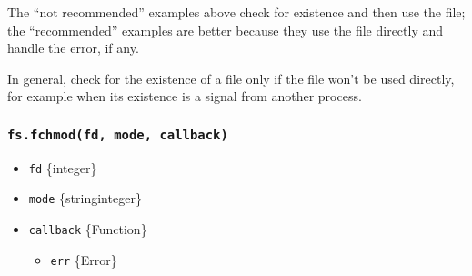 \begin{Shaded}
\begin{Highlighting}[]
\OperatorTok{,} \OperatorTok{;}

\NormalTok{(}\OperatorTok{,} \OperatorTok{,}\OperatorTok{,}\KeywordTok{=\textgreater{}}\NormalTok{ \{}
     \OperatorTok{===} \NormalTok{) \{}
      \NormalTok{(}\NormalTok{)}\OperatorTok{;}
      \OperatorTok{;}
\NormalTok{    \}}

    \OperatorTok{;}
\NormalTok{  \}}

  \NormalTok{ \{}
    \OperatorTok{;}
\NormalTok{  \} }\NormalTok{ \{}
    \OperatorTok{,}\KeywordTok{=\textgreater{}}\NormalTok{ \{}
      \OperatorTok{;}
\NormalTok{    \})}\OperatorTok{;}
\NormalTok{  \}}
\NormalTok{\})}\OperatorTok{;}
\end{Highlighting}
\end{Shaded}

The ``not recommended'' examples above check for existence and then use
the file; the ``recommended'' examples are better because they use the
file directly and handle the error, if any.

In general, check for the existence of a file only if the file won't be
used directly, for example when its existence is a signal from another
process.

\subsubsection{\texorpdfstring{\texttt{fs.fchmod(fd,\ mode,\ callback)}}{fs.fchmod(fd, mode, callback)}}\label{fs.fchmodfd-mode-callback}

\begin{itemize}
\tightlist
\item
  \texttt{fd} \{integer\}
\item
  \texttt{mode} \{string\textbar integer\}
\item
  \texttt{callback} \{Function\}

  \begin{itemize}
  \tightlist
  \item
    \texttt{err} \{Error\}
  \end{itemize}
\end{itemize}

